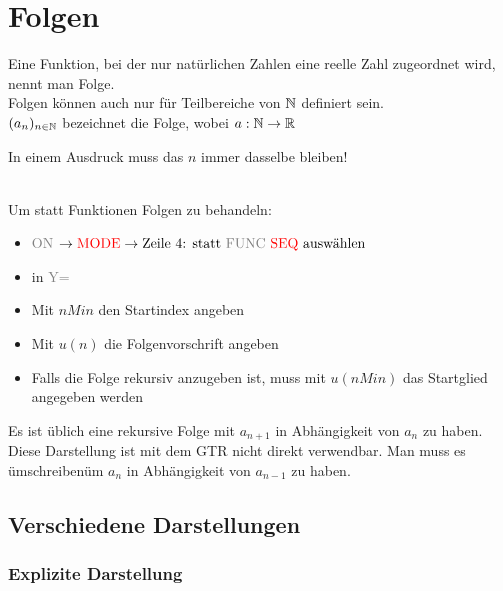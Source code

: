 \documentclass[../MAIN/main.tex]{subfiles}
\begin{document}
\chapter{Folgen}



\begin{Definition}
Eine Funktion, bei der nur natürlichen Zahlen eine reelle Zahl zugeordnet wird, nennt man Folge.\\
Folgen können auch nur für Teilbereiche von $\mathbb{N}$ definiert sein.\\
$(a_{n})_{n\in\mathbb{N}}$ bezeichnet die Folge, wobei $a:\mathbb{N}\rightarrow\mathbb{R}$
\end{Definition}

\begin{Bemerkung}
In einem Ausdruck muss das $n$ immer dasselbe bleiben!
\end{Bemerkung}


\begin{GTR-Tipp}
\\
Um statt Funktionen Folgen zu behandeln:
\begin{itemize}
\item\textcolor{gray}{ON} $\rightarrow \textcolor{red}{\text{MODE}} \rightarrow \text{Zeile 4: statt \textcolor{gray}{FUNC} \textcolor{red}{SEQ} auswählen}$
\item in \textcolor{gray}{Y=}
\item Mit $nMin$ den Startindex angeben
\item Mit $u(n)$ die Folgenvorschrift angeben
\item Falls die Folge rekursiv anzugeben ist, muss mit $u(nMin)$ das Startglied angegeben werden
\end{itemize}
\end{GTR-Tipp}

\begin{Bemerkung}
Es ist üblich eine rekursive Folge mit $a_{n+1}$ in Abhängigkeit von $a_n$ zu haben. Diese Darstellung ist mit dem GTR nicht direkt verwendbar. Man muss es \"umschreiben\" um $a_n$ in Abhängigkeit von $a_{n-1}$ zu haben.
\end{Bemerkung}

		\section{Verschiedene Darstellungen}


	\subsection{Explizite Darstellung}
\end{document}
